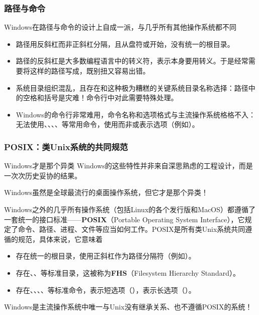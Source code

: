 \begin{frame}
    \frametitle{路径与命令}
    Windows在路径与命令的设计上自成一派，与几乎所有其他操作系统都不同
    \begin{itemize}
        \item 路径用反斜杠\code{\\}而非正斜杠\code{/}分隔，且从盘符或开始，没有统一的根目录。
        \item 路径的反斜杠\code{\\}是大多数编程语言中的转义符，表示\code{\\}本身要用\code{\\\\}转义。于是经常需要将这样的路径写成，既别扭又容易出错。
        \item 系统目录组织混乱，且存在和这种极为糟糕的关键系统目录名称选择：路径中的空格和括号是灾难！命令行中对此需要特殊处理。
        \item Windows的命令行非常难用，命令名称和选项格式与主流操作系统格格不入：无法使用、、、、等常用命令，使用\code{/}而非\code{-}或\code{--}表示选项（例如）。
    \end{itemize}
\end{frame}

\begin{frame}
    \frametitle{POSIX：类Unix系统的共同规范}
    \begin{vspquote}{Windows才是那个异类}
        Windows的这些特性并非来自深思熟虑的工程设计，而是一次次历史妥协的结果。
        
        Windows虽然是全球最流行的桌面操作系统，但它才是那个异类！
    \end{vspquote}
    Windows之外的几乎所有操作系统（包括Linux的各个发行版和MacOS）都遵循了一套统一的接口标准——\textbf{POSIX}（Portable Operating System Interface），它规定了命令、路径、进程、文件等应当如何工作。POSIX是所有类Unix系统共同遵循的规范，具体来说，它意味着
    \begin{itemize}
        \item 存在统一的\code{/}根目录，使用正斜杠\code{/}作为路径分隔符（例如）。
        \item 存在、、等标准目录，这被称为\textbf{FHS}（Filesystem Hierarchy Standard）。
        \item 存在、、、、等标准命令，\code{-}表示短选项（），\code{--}表示长选项（）。
    \end{itemize}
    Windows是主流操作系统中唯一与Unix没有继承关系、也不遵循POSIX的系统！
\end{frame}

